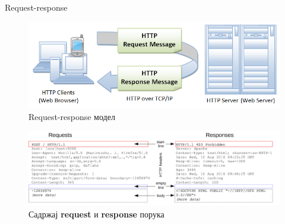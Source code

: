 \documentclass{beamer}
\begin{document}
    \begin{frame}[allowframebreaks]{Request-response}
        \begin{figure}
            \centering
            \includegraphics[width=\textwidth,height=\textheight,keepaspectratio]{images/reqres.png}
            \caption{Request-response модел}
            \label{fig:reqres}
        \end{figure}
        
        \framebreak
        
        \begin{figure}
            \centering
            \includegraphics[width=\textwidth,height=\textheight,keepaspectratio]{images/httpmsgstructure.png}
            \caption{Садржај \textbf{request} и \textbf{response} порука}
            \label{fig:reqrescont}
        \end{figure}
        
        \framebreak
        

\end{frame}
\end{document}
